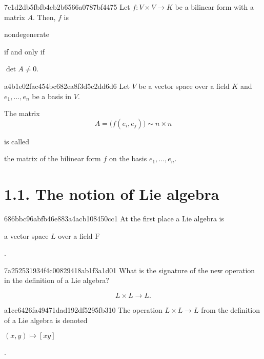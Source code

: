 \begin{note}{7c1d2db5fbfb4cb2b6566a0787bf4475}
    Let \( f : V \times V \to K \) be a bilinear form with a matrix \( A \).
    Then, \( f \) is \begin{icloze}{2}nondegenerate\end{icloze} \begin{icloze}{3}if and only if\end{icloze} \begin{icloze}{1}\( \det A \neq 0 \).\end{icloze}
\end{note}

\begin{note}{a4b1e02fac454bc682ea8f3d5c2dd6d6}
    Let \( V \) be a vector space over a field \( K \) and \( e_1,\ldots, e_n \) be a basis in \( V \).
    \begin{icloze}{1}The matrix
    \[
        A = \Big(f(e_i, e_j)\Big) \sim n \times n
    \]\end{icloze}
    is called \begin{icloze}{2}the matrix of the bilinear form \( f \) on the basis \( e_1, \ldots, e_n \).\end{icloze}
\end{note}

\section{1.1. The notion of Lie algebra}
\begin{note}{686bbc96abfb46e883a4acb108450cc1}
    At the first place a Lie algebra is \begin{icloze}{1}a vector space \( L \)
    over a field \( \mathrm F \)\end{icloze}.
\end{note}

\begin{note}{7a252531934f4c00829418ab1f3a1d01}
    What is the signature of the new operation in the definition of a Lie
    algebra?

    \begin{cloze}{1}
        \[
            L \times L \to L.
        \]
    \end{cloze}
\end{note}

\begin{note}{a1cc6426fa49471dad192df5295fb310}
    The operation \( L \times L \to L \) from the definition of a Lie algebra is
    denoted \begin{icloze}{1}\( (x, y) \mapsto [xy] \)\end{icloze}.
\end{note}

